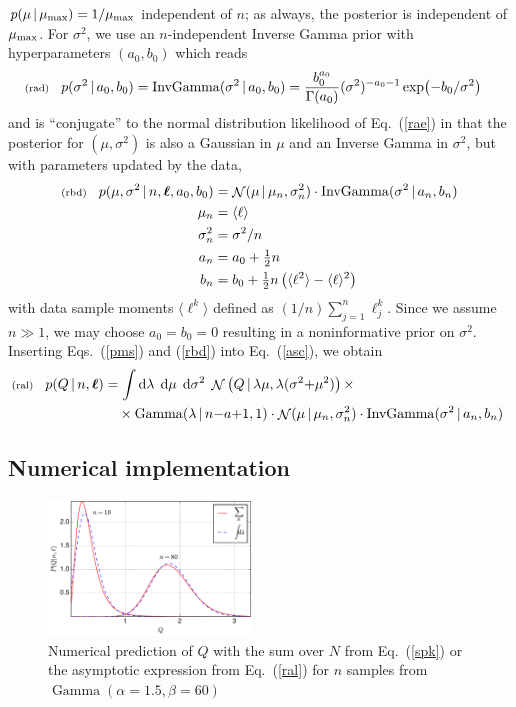 \documentclass[11pt]{article}
\newcommand{\lleq}[1]{\label{#1} }
\renewcommand{\lleq}[1]{\label{#1} {\scriptstyle {\rm (#1)}} \hspace*{2ex} }
\newcommand{\cond}{\,|\,}
\newcommand{\refeq}[1]{Eq.~(\ref{#1})}
\DeclareMathOperator{\GammaDist}{Gamma}
\DeclareMathOperator{\GaussianDist}{\mathcal{N}}
\DeclareMathOperator{\InvGammaDist}{InvGamma}
\newcommand{\Lumtot}{Q}
\newcommand{\lum}{\ell}
\newcommand{\rmdx}[1]{\dd{#1}} %
\begin{document}
$p(\mu\cond\mu_{\rm max}) = 1/\mu_{\rm max}$ independent of $n$; as
always, the posterior is independent of $\mu_{\rm max}$.  For
$\sigma^2$, we use an $n$-independent Inverse Gamma prior with
hyperparameters $(a_0,b_0)$ which reads
\begin{align}
  \lleq{rad}
  p(\sigma^2\cond a_0,b_0)
  = \InvGammaDist(\sigma^2\cond a_0,b_0)
  &= \frac{b_0^{a_0}}{\Gamma(a_0)} (\sigma^2)^{-a_0-1} \exp(-b_0/\sigma^2)
\end{align}
and is ``conjugate'' to the normal distribution likelihood of
\refeq{rae} in that the posterior for $(\mu,\sigma^2)$ is also a
Gaussian in $\mu$ and an Inverse Gamma in $\sigma^2$, but with
parameters updated by the data,
\begin{align}
  \lleq{rbd}
  p(\mu,\sigma^2\cond n,\bml,a_0,b_0)
  &= \GaussianDist(\mu\cond \mu_n,\sigma_n^2)
  \cdot
  \InvGammaDist(\sigma^2\cond a_n,b_n) \\
  \mu_n &= \langle\ell\rangle\\
  \sigma_n^2 &= \sigma^2/n \\
  a_n &= a_0 + \tfrac{1}{2}n \\
  b_n &= b_0 + \tfrac{1}{2} n\left( \langle\ell^2\rangle - \langle\ell\rangle^2\right)
\end{align}
with data sample moments $\langle\lum^k\rangle$ defined as
$(1/n) \sum_{j=1}^n \lum_j^k$. Since we assume $n \gg 1$, we may
choose $a_0 = b_0 = 0$ resulting in a noninformative prior on $\sigma^2$.
%
Inserting Eqs.~(\ref{pms}) and (\ref{rbd}) into \refeq{asc}, we obtain
\begin{align}
  \lleq{ral}
  p(\Lumtot \cond n,\bml)
  &= \int \rmdx{\lambda}\; \rmdx{\mu}\; \rmdx{\sigma^2}\;
  \GaussianDist \left( \Lumtot \cond \lambda \mu, \lambda (\sigma^2{+}\mu^2) \right)
  \times\\
  &\quad\times
  \GammaDist(\lambda \cond n{-}a{+}1 , 1) \cdot
  \GaussianDist(\mu\cond \mu_n,\sigma_n^2) \cdot
  \InvGammaDist(\sigma^2\cond a_n,b_n) \;
  \nonumber
\end{align}

\subsection{Numerical implementation}\label{sec:asympt-numeric}


\begin{figure}[ht]
  \centering
  \includegraphics[width=0.48\textwidth]{asymptotic}
  \caption{Numerical prediction of $\Lumtot$ with the sum over $N$
    from \refeq{spk} or the asymptotic expression from \refeq{ral} for $n$
    samples from $\GammaDist(\alpha=1.5, \beta=60)$}
\label{fig:asymptotic}
\end{figure}
\end{document}
